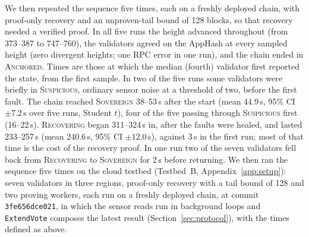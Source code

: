 We then repeated the sequence five times, each on a freshly deployed chain, with proof-only recovery and an unproven-tail
bound of 128 blocks, so that recovery needed a verified proof. In all five
runs the height advanced throughout (from 373--387 to 747--760), the
validators agreed on the AppHash at every sampled height (zero divergent
heights; one RPC error in one run), and the chain ended in \textsc{Anchored}.
Times are those at which the median (fourth) validator first reported the state, from the first sample. In two of the five runs some validators were briefly in \textsc{Suspicious}, ordinary sensor noise at a threshold of two, before the first fault. The chain reached \textsc{Sovereign} 38--53\,s after the start (mean 44.9\,s, 95\% CI
$\pm$7.2\,s over five runs, Student $t$), four of the five passing through
\textsc{Suspicious} first (16--22\,s). \textsc{Recovering} began 311--324\,s in,
after the faults were healed, and lasted 233--257\,s (mean 240.6\,s, 95\% CI
$\pm$12.0\,s), against 3\,s in the first run; most of that time is the cost of
the recovery proof. In one run two of the seven validators fell back from
\textsc{Recovering} to \textsc{Sovereign} for 2\,s before returning.
We then ran the sequence five times on the cloud testbed (Testbed~B, Appendix~\ref{app:setup}): seven validators in three
regions, proof-only recovery with a tail bound of 128 and two proving workers, each run on a freshly deployed chain, at commit \texttt{3fe656dce021}, in which the sensor reads run in background loops and \texttt{ExtendVote} composes the latest result
(Section~\ref{sec:protocol}), with the times defined as above.

